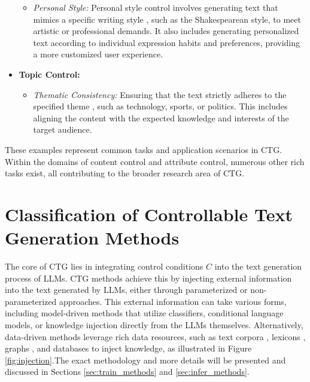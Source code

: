 \documentclass[acmsmall, screen]{acmart}
\begin{document}
\begin{itemize}
\begin{itemize}
        \item \textit{Personal Style:} Personal style control involves generating text that mimics a specific writing style \cite{upadhyay_arxiv22_DRL,tao_arxiv24_CAT,subramani_acl22_LatentStreeringVectors}, such as the Shakespearean style, to meet artistic or professional demands. It also includes generating personalized text according to individual expression habits and preferences, providing a more customized user experience.
    \end{itemize}
    
    \item \textbf{Topic Control:}
    \begin{itemize}
        \item \textit{Thematic Consistency:} Ensuring that the text strictly adheres to the specified theme \cite{dathathri_iclr20_PPLM,chan_iclr21_CoCon}, such as technology, sports, or politics. This includes aligning the content with the expected knowledge and interests of the target audience.
    \end{itemize}
    
\end{itemize}

These examples represent common tasks and application scenarios in CTG. Within the domains of content control and attribute control, numerous other rich tasks exist, all contributing to the broader research area of CTG.


\section{Classification of Controllable Text Generation Methods}
\label{sec:ctg_methods}

The core of CTG lies in integrating control conditions \(C\) into the text generation process of LLMs. CTG methods achieve this by injecting external information into the text generated by LLMs, either through parameterized or non-parameterized approaches. This external information can take various forms, including model-driven methods that utilize classifiers, conditional language models, or knowledge injection directly from the LLMs themselves. Alternatively, data-driven methods leverage rich data resources, such as text corpora \cite{keskar_arxiv19_Ctrl,zeldes_arxiv20_AuxiliaryTuning}, lexicons \cite{pascual_emnlp21_K2T}, graphs \cite{liang_arxiv24_DATG}, and databases \cite{nawezi_tllm23_kNN-CTG,pozzobon_emnlp23_goodtriever} to inject knowledge, as illustrated in Figure \ref{fig:injection}.The exact methodology and more details will be presented and discussed in Sections \ref{sec:train_methods} and \ref{sec:infer_methods}.
\end{document}
